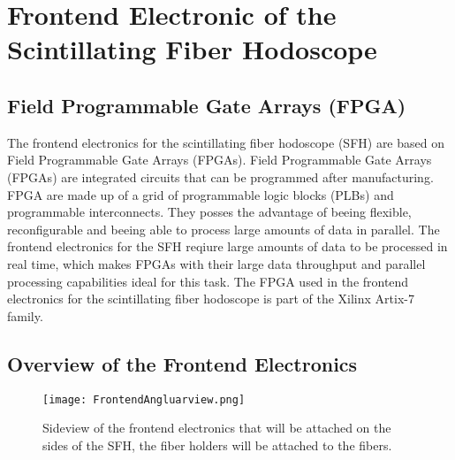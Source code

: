 \chapter{Frontend Electronic of the Scintillating Fiber Hodoscope}\label{cha:frontend}

\noindent
\section{Field Programmable Gate Arrays (FPGA)}\label{sec:FPGA}
The frontend electronics for the scintillating fiber hodoscope (SFH) are based on Field Programmable Gate Arrays (FPGAs).
Field Programmable Gate Arrays (FPGAs) are integrated circuits that can be programmed after manufacturing.
FPGA are made up of a grid of programmable logic blocks (PLBs) and programmable interconnects.
They posses the advantage of beeing flexible, reconfigurable and beeing able to process large amounts of data in parallel.
The frontend electronics for the SFH reqiure large amounts of data to be processed in real time, which makes FPGAs with their large data throughput and parallel processing capabilities ideal for this task.\autocite{FPGA_reviewDSP}
\newline
The FPGA used in the frontend electronics for the scintillating fiber hodoscope is part of the Xilinx Artix-7 family.\autocite{InternalcommunicationIgor}
\section{Overview of the Frontend Electronics}
\begin{figure}[h]
    \centering
    \texttt{[image: FrontendAngluarview.png]}
    \caption{Sideview of the frontend electronics that will be attached on the sides of the SFH, the fiber holders will be attached to the fibers.\autocite{InternalcommunicationKarl} }
    \label{fig:SideviewModelElectronics}
    \end{figure}
